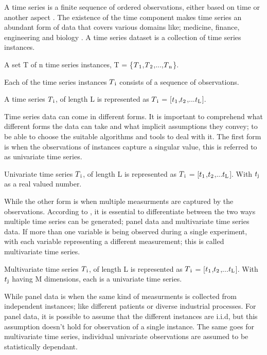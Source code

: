 A time series is a finite sequence of ordered observations, either based on time or another aspect \cite{abanda2019review,bagnall2017great}.
The existence of the time component makes time series an abundant form of data that covers various domains like; medicine, finance, engineering and biology \cite{lines2018time}.
A time series dataset is a collection of time series instances.
\begin{definition}
A set T of n time series instances, T = \{$T\textsubscript{1}$,$T\textsubscript{2}$,...,$T\textsubscript{n}$\}.
\end{definition}
Each of the time series instances $T\textsubscript{i}$ consists of a sequence of observations.
\begin{definition}
A time series $T\textsubscript{i}$, of length L is represented as $T\textsubscript{i}$ = [$t\textsubscript{1}$,$t\textsubscript{2}$,...$t\textsubscript{L}$].
\end{definition}
Time series data can come in different forms. It is important to comprehend what different forms the data can take and what implicit assumptions they convey; to be able to choose the suitable algorithms and tools to deal with it.\newline
The first form is when the observations of instances capture a singular value, this is referred to as univariate time series.
\begin{definition}
Univariate time series $T\textsubscript{i}$, of length L is represented as 
$T\textsubscript{i}$ = [$t\textsubscript{1}$,$t\textsubscript{2}$,...$t\textsubscript{L}$].
With $t\textsubscript{j}$ as a real valued number.
\end{definition}
While the other form is when multiple measurments are captured by the observations.
According to \cite{loning2019sktime}, it is essential to differentiate between the two ways multiple time series can be generated; panel data and multivariate time series data.\newline
If more than one variable is being observed during a single experiment, with each variable representing a different measurement; this is called multivariate time series.
\begin{definition}
Multivariate time series $T\textsubscript{i}$, of length L is represented as $T\textsubscript{i}$ = [$t\textsubscript{1}$,$t\textsubscript{2}$,...$t\textsubscript{L}$]. With $t\textsubscript{j}$ having M dimensions, each is a univariate time series.
\end{definition}
While panel data is when the same kind of measurments is collected from independent instances; like different patients or diverse industrial processes.\newline
For panel data, it is possible to assume that the different instances are i.i.d, but this assumption doesn't hold for observation of a single instance.
The same goes for multivariate time series, individual univariate observations are assumed to be statistically dependant.